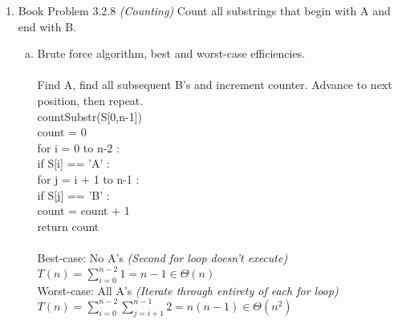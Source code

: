 \documentclass[11pt]{article}
\begin{document}
\begin{enumerate}
	\item Book Problem 3.2.8 \textit{(Counting)}
		Count all substrings that begin with A and end with B.
		\begin{enumerate}[(a)]
			\item Brute force algorithm, best and worst-case efficiencies. \\\\
				Find A, find all subsequent B's and increment counter. Advance to next position, then repeat. \\
				countSubstr(S[0,n-1]) \\
				\hspace*{.4cm}
				count = 0 \\
				\hspace*{.4cm}
				for i = 0 to n-2 : \\
					\hspace*{.8cm}
					if S[i] == 'A' : \\
						\hspace*{1.2cm}
						for j = i + 1 to n-1 : \\
							\hspace*{1.6cm}
							if S[j] == 'B' : \\
								\hspace*{2cm}
								count = count + 1 \\
				\hspace*{.4cm}
				return count	\\\\
			Best-case: No A's \textit{(Second for loop doesn't execute)}\\
				\hspace*{.4cm}
				$ T(n) = \sum_{i=0}^{n-2} 1 = n - 1 \in \Theta(n) $ \\
			Worst-case: All A's \textit{(Iterate through entirety of each for loop)} \\
				\hspace*{.4cm}
				$ T(n) = \sum_{i=0}^{n-2} \sum_{j=i+1}^{n-1} 2 = n(n-1) \in \Theta(n^2) $ \\
			

\end{enumerate}
\end{enumerate}
\end{document}
